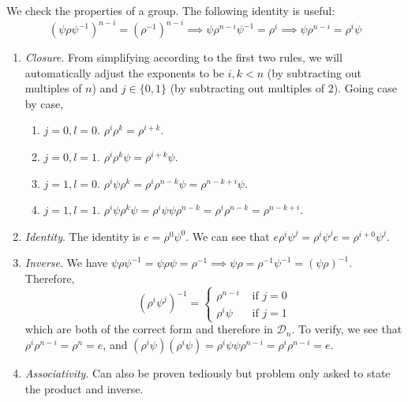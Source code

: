   \begin{solution}
    We check the properties of a group. The following identity is useful: 
    \begin{equation}
      (\psi \rho \psi^{-1})^{n-i} = (\rho^{-1})^{n-i} \implies \psi \rho^{n-i} \psi^{-1} = \rho^i \implies \psi \rho^{n-i} = \rho^i \psi
    \end{equation}
    \begin{enumerate}
      \item \textit{Closure}. From simplifying according to the first two rules, we will automatically adjust the exponents to be $i, k < n$ (by subtracting out multiples of $n$) and $j \in \{0, 1\}$ (by subtracting out multiples of $2$). Going case by case, 
      \begin{enumerate}
        \item $j = 0, l = 0$. $\rho^i \rho^k = \rho^{i+k}$. 
        \item $j = 0, l = 1$. $\rho^i \rho^k \psi = \rho^{i+k} \psi$. 
        \item $j = 1, l = 0$. $\rho^i \psi \rho^k = \rho^i \rho^{n-k} \psi = \rho^{n-k+i} \psi$. 
        \item $j = 1, l = 1$. $\rho^i \psi \rho^k \psi = \rho^i \psi \psi \rho^{n-k} = \rho^i \rho^{n-k} = \rho^{n-k+i}$. 
      \end{enumerate}
      \item \textit{Identity}. The identity is $e = \rho^0 \psi^0$. We can see that $e \rho^i \psi^j = \rho^i \psi^j e = \rho^{i+0} \psi^j$. 
      \item \textit{Inverse}. We have $\psi \rho \psi^{-1} = \psi \rho \psi = \rho^{-1} \implies \psi \rho = \rho^{-1} \psi^{-1} = (\psi \rho)^{-1}$. Therefore, 
      \begin{equation}
        (\rho^i \psi^j)^{-1} = \begin{cases} 
          \rho^{n - i} & \text{ if } j = 0  \\
          \rho^{i} \psi & \text{ if } j = 1
        \end{cases}
      \end{equation}
      which are both of the correct form and therefore in $\mathcal{D}_n$. To verify, we see that $\rho^i \rho^{n-i} = \rho^n = e$, and $(\rho^i \psi) (\rho^i \psi) = \rho^i \psi \psi \rho^{n-i} = \rho^i \rho^{n-i} = e$.  
      \item \textit{Associativity}. Can also be proven tediously but problem only asked to state the product and inverse.  
    \end{enumerate} 


\end{solution}
